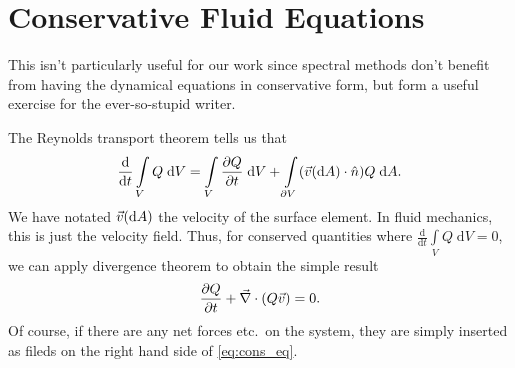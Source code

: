 \documentclass[11pt,
        usenames, %
        dvipsnames %
    ]{report}
\newcommand*{\rd}[2]{\frac{\mathrm{d}#1}{\mathrm{d}#2}}
\newcommand*{\pd}[2]{\frac{\partial#1}{\partial#2}}
\DeclarePairedDelimiter\p{\lparen}{\rparen}
\begin{document}
\section{Conservative Fluid Equations}

This isn't particularly useful for our work since spectral methods don't benefit
from having the dynamical equations in conservative form, but form a useful
exercise for the ever-so-stupid writer.

The Reynolds transport theorem tells us that
\begin{equation}
    \rd{}{t}\int\limits_V Q\;\mathrm{d}V
        = \int\limits_V \pd{Q}{t}\;\mathrm{d}V
            + \int\limits_{\partial V}
                \p*{\vec{v}\p*{\mathrm{d}A} \cdot \hat{n}} Q\;\mathrm{d}A.
\end{equation}
We have notated $\vec{v}\p*{\mathrm{d}A}$ the velocity of the surface element.
In fluid mechanics, this is just the velocity field. Thus, for conserved
quantities where $\rd{}{t}\int\limits_V Q\;\mathrm{d}V = 0$, we can apply
divergence theorem to obtain the simple result
\begin{equation}
    \pd{Q}{t} + \vec{\nabla} \cdot \p*{Q\vec{v}} = 0.\label{eq:cons_eq}
\end{equation}
Of course, if there are any net forces etc.\ on the system, they are simply
inserted as fileds on the right hand side of \autoref{eq:cons_eq}.
\end{document}
